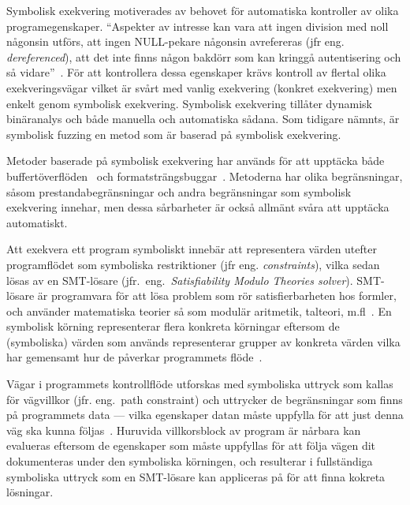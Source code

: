 


Symbolisk exekvering motiverades av behovet för automatiska kontroller av olika
programegenskaper. ``Aspekter av intresse kan vara att ingen division med
noll någonsin utförs, att ingen NULL-pekare någonsin avrefereras (jfr eng.
\emph{dereferenced}), att det inte finns någon bakdörr som kan kringgå
autentisering och så vidare''~\cite{survey_symb_exc}. För att kontrollera dessa
egenskaper krävs kontroll av flertal olika exekveringsvägar vilket är svårt med
vanlig exekvering (konkret exekvering) men enkelt genom symbolisk exekvering.
Symbolisk exekvering tillåter dynamisk binäranalys och både manuella och
automatiska sådana. Som tidigare nämnts, är symbolisk fuzzing en metod som är baserad på symbolisk
exekvering.


Metoder baserade på symbolisk exekvering har används för att upptäcka både
buffertöverflöden~\cite{bofaeg} och formatsträngsbuggar~\cite{vakkaupad15}.
Metoderna har olika begränsningar, såsom prestandabegränsningar och andra
begränsningar som symbolisk exekvering innehar, men dessa sårbarheter är också
allmänt svåra att upptäcka automatiskt.

Att exekvera ett program symboliskt innebär att representera värden utefter
programflödet som symboliska restriktioner (jfr eng. \emph{constraints}), vilka sedan
lösas av en SMT-lösare (jfr.\ eng.\ \emph{Satisfiability Modulo Theories solver}). SMT-lösare är programvara för att
lösa problem som rör satisfierbarheten hos formler, och använder matematiska teorier så
som modulär aritmetik, talteori, m.fl~\cite{symqemu}. %
En symbolisk körning representerar flera konkreta körningar eftersom de (symboliska) värden som
används representerar grupper av konkreta värden vilka har gemensamt hur de
påverkar programmets flöde~\cite{klee}.

Vägar i programmets kontrollflöde utforskas med symboliska uttryck som kallas
för vägvillkor (jfr. eng.\ path constraint) och uttrycker de begränsningar som finns på
programmets data --- vilka egenskaper datan måste uppfylla för att just denna väg
ska kunna följas~\cite{klee}. Huruvida villkorsblock av program är nårbara kan
evalueras eftersom de egenskaper som måste uppfyllas för att följa vägen dit dokumenteras
under den symboliska körningen, och resulterar i fullständiga symboliska uttryck som en
SMT-lösare kan appliceras på för att finna kokreta lösningar.

